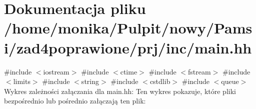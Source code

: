 \hypertarget{main_8hh}{\section{\-Dokumentacja pliku /home/monika/\-Pulpit/nowy/\-Pamsi/zad4poprawione/prj/inc/main.hh}
\label{main_8hh}
}
{\ttfamily \#include $<$iostream$>$}\*
{\ttfamily \#include $<$ctime$>$}\*
{\ttfamily \#include $<$fstream$>$}\*
{\ttfamily \#include $<$limits$>$}\*
{\ttfamily \#include $<$string$>$}\*
{\ttfamily \#include $<$cstdlib$>$}\*
{\ttfamily \#include $<$queue$>$}\*
\-Wykres zależności załączania dla main.\-hh\-:
\-Ten wykres pokazuje, które pliki bezpośrednio lub pośrednio załączają ten plik\-:
